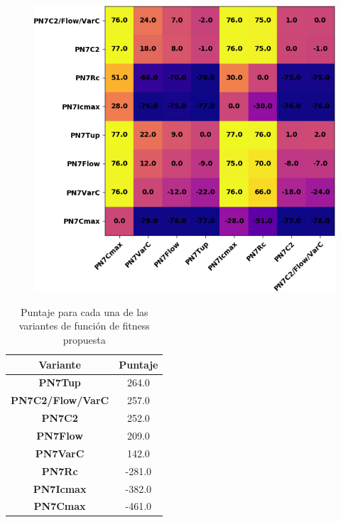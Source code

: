 \begin{figure}[hbtp]
    \centering
    \includegraphics[scale=.8]{Imagenes/fitnesscomp.png}
    \label{fig:fcomp}
\end{figure}
\begin{table}[hbtp]
    \centering
\begin{tabular}{@{}cc@{}}
Variante & Puntaje \\ \midrule
\toprule
    \textbf{PN7Tup} & 264.0 \\ \midrule
    \textbf{PN7C2/Flow/VarC} & 257.0 \\ \midrule
    \textbf{PN7C2} & 252.0 \\ \midrule
    \textbf{PN7Flow} & 209.0 \\ \midrule
    \textbf{PN7VarC} & 142.0 \\ \midrule
    \textbf{PN7Rc} & -281.0 \\ \midrule
    \textbf{PN7Icmax} & -382.0 \\ \midrule
    \textbf{PN7Cmax} & -461.0 \\ \midrule
\end{tabular}
    \caption{Puntaje para cada una de las variantes de función de fitness propuesta}
    \label{tab:fcomp}
\end{table}

